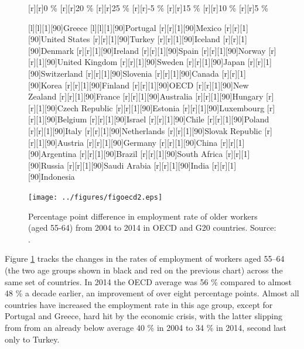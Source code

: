 \documentclass[11 pt, a4paper]{report}
\begin{document}
\begin{figure}[hbtp!]
[r][r]{\small{0 \%}}
[r][r]{\small{20 \%}}
[r][r]{\small{25 \%}}
[r][r]{\small{-5 \%}}
[r][r]{\small{15 \%}}
[r][r]{\small{10 \%}}
[r][r]{\small{5 \%}}

[l][l][1][90]{\tiny{Greece}}
[l][l][1][90]{\tiny{Portugal}}
[r][r][1][90]{\tiny{Mexico}}
[r][r][1][90]{\tiny{United States}}
[r][r][1][90]{\tiny{Turkey}}
[r][r][1][90]{\tiny{Iceland}}
[r][r][1][90]{\tiny{Denmark}}
[r][r][1][90]{\tiny{Ireland}}
[r][r][1][90]{\tiny{Spain}}
[r][r][1][90]{\tiny{Norway}}
[r][r][1][90]{\tiny{\color{red}United Kingdom}}
[r][r][1][90]{\tiny{Sweden}}
[r][r][1][90]{\tiny{Japan}}
[r][r][1][90]{\tiny{Switzerland}}
[r][r][1][90]{\tiny{Slovenia}}
[r][r][1][90]{\tiny{Canada}}
[r][r][1][90]{\tiny{Korea}}
[r][r][1][90]{\tiny{Finland}}
[r][r][1][90]{\tiny{OECD}}
[r][r][1][90]{\tiny{New Zealand}}
[r][r][1][90]{\tiny{France}}
[r][r][1][90]{\tiny{Australia}}
[r][r][1][90]{\tiny{Hungary}}
[r][r][1][90]{\tiny{Czech Republic}}
[r][r][1][90]{\tiny{Estonia}}
[r][r][1][90]{\tiny{Luxembourg}}
[r][r][1][90]{\tiny{Belgium}}
[r][r][1][90]{\tiny{Israel}}
[r][r][1][90]{\tiny{Chile}}
[r][r][1][90]{\tiny{Poland}}
[r][r][1][90]{\tiny{Italy}}
[r][r][1][90]{\tiny{Netherlands}}
[r][r][1][90]{\tiny{Slovak Republic}}
[r][r][1][90]{\tiny{Austria}}
[r][r][1][90]{\tiny{Germany}}
[r][r][1][90]{\tiny{China}}
[r][r][1][90]{\tiny{Argentina}}
[r][r][1][90]{\tiny{Brazil}}
[r][r][1][90]{\tiny{South Africa}}
[r][r][1][90]{\tiny{Russia}}
[r][r][1][90]{\tiny{Saudi Arabia}}
[r][r][1][90]{\tiny{India}}
[r][r][1][90]{\tiny{Indonesia}}

\texttt{[image: ../figures/figoecd2.eps]}
\caption{Percentage point difference in employment rate of older workers (aged 55-64) from 2004 to 2014 in OECD and G20 countries. Source: \cite{OECD2015}.}
\label{Fig:OECD2}
\end{figure}

Figure \ref{Fig:OECD2} tracks the changes in the rates of employment of workers aged 55--64 (the two age groups shown in black and red on the previous chart) across the same set of countries. In 2014 the OECD average was 56 \% compared to almost 48 \% a decade earlier, an improvement of over eight percentage points. Almost all countries have increased the employment rate in this age group, except for Portugal and Greece, hard hit by the economic crisis, with the latter slipping from from an already below average 40 \% in 2004 to 34 \% in 2014, second last only to Turkey. 
\end{document}
